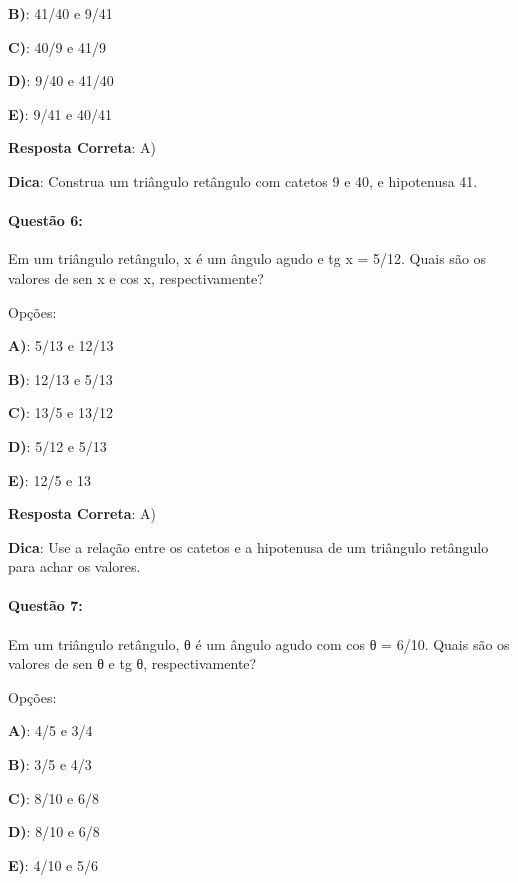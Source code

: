 \documentclass{article}
\begin{document}
\textbf{B)}: 41/40 e 9/41 

\textbf{C)}: 40/9 e 41/9 

\textbf{D)}: 9/40 e 41/40 

\textbf{E)}: 9/41 e 40/41 

\vspace{\baselineskip}\textbf{Resposta Correta}: A)

\vspace{\baselineskip}\textbf{Dica}: Construa um triângulo retângulo com catetos 9 e 40, e hipotenusa 41.

\paragraph{Questão 6:}
{Em um triângulo retângulo, x é um ângulo agudo e tg x = 5/12. Quais são os valores de sen x e cos x, respectivamente?}

\vspace{\baselineskip}Opções:

\vspace{\baselineskip}\textbf{A)}: 5/13 e 12/13 

\textbf{B)}: 12/13 e 5/13 

\textbf{C)}: 13/5 e 13/12 

\textbf{D)}: 5/12 e 5/13 

\textbf{E)}: 12/5 e 13 

\vspace{\baselineskip}\textbf{Resposta Correta}: A)

\vspace{\baselineskip}\textbf{Dica}: Use a relação entre os catetos e a hipotenusa de um triângulo retângulo para achar os valores.

\paragraph{Questão 7:}
{Em um triângulo retângulo, θ é um ângulo agudo com cos θ = 6/10. Quais são os valores de sen θ e tg θ, respectivamente?}

\vspace{\baselineskip}Opções:

\vspace{\baselineskip}\textbf{A)}: 4/5 e 3/4 

\textbf{B)}: 3/5 e 4/3 

\textbf{C)}: 8/10 e 6/8 

\textbf{D)}: 8/10 e 6/8 

\textbf{E)}: 4/10 e 5/6 
\end{document}
